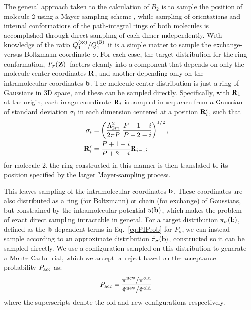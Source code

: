         The general approach taken to the calculation of $B_2$ is to sample the position of molecule 2 using a Mayer-sampling scheme \cite{Singh2004}, while sampling of orientations and internal conformations of the path-integral rings of both molecules is accomplished through direct sampling of each dimer independently. With knowledge of the ratio $Q_1^{\rm (xc)}/Q_1^{\rm (B)}$ it is a simple matter to sample the exchange-versus-Boltzmann coordinate $\sigma$. For each case, the target distribution for the ring conformation, $P_\sigma({\mathbf {Z}})$, factors cleanly into a component that depends on only the molecule-center coordinates ${\mathbf {R}}$, and another depending only on the intramolecular coordinates ${\mathbf {b}}$. The molecule-center distribution is just a ring of Gaussians in 3D space, and these can be sampled directly. Specifically, with ${\mathbf {R}}_1$ at the origin, each image coordinate ${\mathbf {R}}_i$ is sampled in sequence from a Gaussian of standard deviation $\sigma_i$ in each dimension centered at a position ${\mathbf {R}}_i'$, such that \cite{Shaul2012}
        \begin{equation}
            \begin{aligned}
                \sigma _i &= \left( \frac{\Lambda _{2m}^2}{2\pi P}\;\frac{P + 1 - i}{P + 2 - i} \right)^{1/2},\\
                {\mathbf {R}}_i'  &= \frac{P + 1 - i}{P + 2 - i}{{\mathbf {R}}_{i - 1}};
            \end{aligned}
        \end{equation}
        for molecule 2, the ring constructed in this manner is then translated to its position specified by the larger Mayer-sampling process.

        This leaves sampling of the intramolecular coordinates ${\mathbf {b}}$. These coordinates are also distributed as a ring (for Boltzmann) or chain (for exchange) of Gaussians, but constrained by the intramolecular potential $\bar u({\mathbf {b}})$, which makes the problem of exact direct sampling intractable in general. For a target distribution $\pi_\sigma({\mathbf {b}})$, defined as the ${\mathbf {b}}$-dependent terms in Eq.~\ref{eq:PIProb} for $P_\sigma$, we can instead sample according to an approximate distribution $\tilde \pi_\sigma({\mathbf {b}})$, constructed so it can be sampled directly. We use a configuration sampled on this distribution to generate a Monte Carlo trial, which we accept or reject based on the acceptance probability $P_{\rm acc}$ as:
        \begin{equation}
        \label{eq:Pacc}
            P_{\rm acc} = \frac{\pi^{\rm new}/\pi^{\rm old}}{\tilde \pi^{\rm new}/\tilde \pi^{\rm old}}
        \end{equation}
        where the superscripts denote the old and new configurations respectively.

